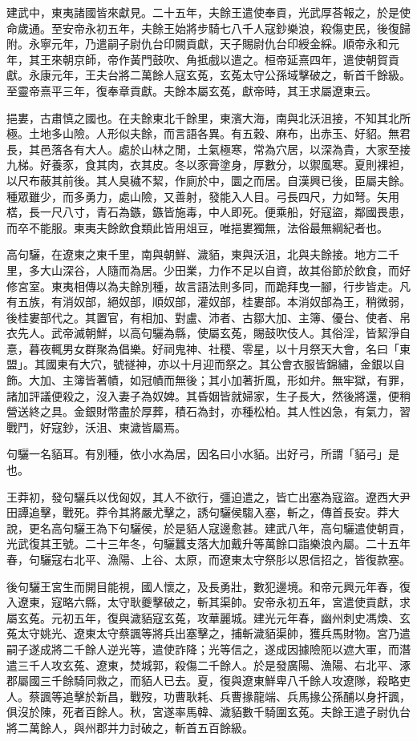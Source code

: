 \begin{pinyinscope}
建武中，東夷諸國皆來獻見。二十五年，夫餘王遣使奉貢，光武厚荅報之，於是使命歲通。至安帝永初五年，夫餘王始將步騎七八千人寇鈔樂浪，殺傷吏民，後復歸附。永寧元年，乃遣嗣子尉仇台印闕貢獻，天子賜尉仇台印綬金綵。順帝永和元年，其王來朝京師，帝作黃門鼓吹、角抵戲以遣之。桓帝延熹四年，遣使朝賀貢獻。永康元年，王夫台將二萬餘人寇玄菟，玄菟太守公孫域擊破之，斬首千餘級。至靈帝熹平三年，復奉章貢獻。夫餘本屬玄菟，獻帝時，其王求屬遼東云。

挹婁，古肅慎之國也。在夫餘東北千餘里，東濱大海，南與北沃沮接，不知其北所極。土地多山險。人形似夫餘，而言語各異。有五穀、麻布，出赤玉、好貂。無君長，其邑落各有大人。處於山林之閒，土氣極寒，常為穴居，以深為貴，大家至接九梯。好養豕，食其肉，衣其皮。冬以豕膏塗身，厚數分，以禦風寒。夏則裸袒，以尺布蔽其前後。其人臭穢不絜，作廁於中，圜之而居。自漢興已後，臣屬夫餘。種眾雖少，而多勇力，處山險，又善射，發能入人目。弓長四尺，力如弩。矢用楛，長一尺八寸，青石為鏃，鏃皆施毒，中人即死。便乘船，好寇盜，鄰國畏患，而卒不能服。東夷夫餘飲食類此皆用俎豆，唯挹婁獨無，法俗最無綱紀者也。

高句驪，在遼東之東千里，南與朝鮮、濊貊，東與沃沮，北與夫餘接。地方二千里，多大山深谷，人隨而為居。少田業，力作不足以自資，故其俗節於飲食，而好修宮室。東夷相傳以為夫餘別種，故言語法則多同，而跪拜曳一腳，行步皆走。凡有五族，有消奴部，絕奴部，順奴部，灌奴部，桂婁部。本消奴部為王，稍微弱，後桂婁部代之。其置官，有相加、對盧、沛者、古鄒大加、主簿、優台、使者、帛衣先人。武帝滅朝鮮，以高句驪為縣，使屬玄菟，賜鼓吹伎人。其俗淫，皆絜淨自憙，暮夜輒男女群聚為倡樂。好祠鬼神、社稷、零星，以十月祭天大會，名曰「東盟」。其國東有大穴，號禭神，亦以十月迎而祭之。其公會衣服皆錦繡，金銀以自飾。大加、主簿皆著幘，如冠幘而無後；其小加著折風，形如弁。無牢獄，有罪，諸加評議便殺之，沒入妻子為奴婢。其昏姻皆就婦家，生子長大，然後將還，便稍營送終之具。金銀財幣盡於厚葬，積石為封，亦種松柏。其人性凶急，有氣力，習戰鬥，好寇鈔，沃沮、東濊皆屬焉。

句驪一名貊耳。有別種，依小水為居，因名曰小水貊。出好弓，所謂「貊弓」是也。

王莽初，發句驪兵以伐匈奴，其人不欲行，彊迫遣之，皆亡出塞為寇盜。遼西大尹田譚追擊，戰死。莽令其將嚴尤擊之，誘句驪侯騶入塞，斬之，傳首長安。莽大說，更名高句驪王為下句驪侯，於是貊人寇邊愈甚。建武八年，高句驪遣使朝貢，光武復其王號。二十三年冬，句驪蠶支落大加戴升等萬餘口詣樂浪內屬。二十五年春，句驪寇右北平、漁陽、上谷、太原，而遼東太守祭肜以恩信招之，皆復款塞。

後句驪王宮生而開目能視，國人懷之，及長勇壯，數犯邊境。和帝元興元年春，復入遼東，寇略六縣，太守耿夔擊破之，斬其渠帥。安帝永初五年，宮遣使貢獻，求屬玄菟。元初五年，復與濊貊寇玄菟，攻華麗城。建光元年春，幽州刺史馮煥、玄菟太守姚光、遼東太守蔡諷等將兵出塞擊之，捕斬濊貊渠帥，獲兵馬財物。宮乃遣嗣子遂成將二千餘人逆光等，遣使詐降；光等信之，遂成因據險阨以遮大軍，而潛遣三千人攻玄菟、遼東，焚城郭，殺傷二千餘人。於是發廣陽、漁陽、右北平、涿郡屬國三千餘騎同救之，而貊人已去。夏，復與遼東鮮卑八千餘人攻遼隊，殺略吏人。蔡諷等追擊於新昌，戰歿，功曹耿耗、兵曹掾龍端、兵馬掾公孫酺以身扞諷，俱沒於陳，死者百餘人。秋，宮遂率馬韓、濊貊數千騎圍玄菟。夫餘王遣子尉仇台將二萬餘人，與州郡并力討破之，斬首五百餘級。


\end{pinyinscope}
